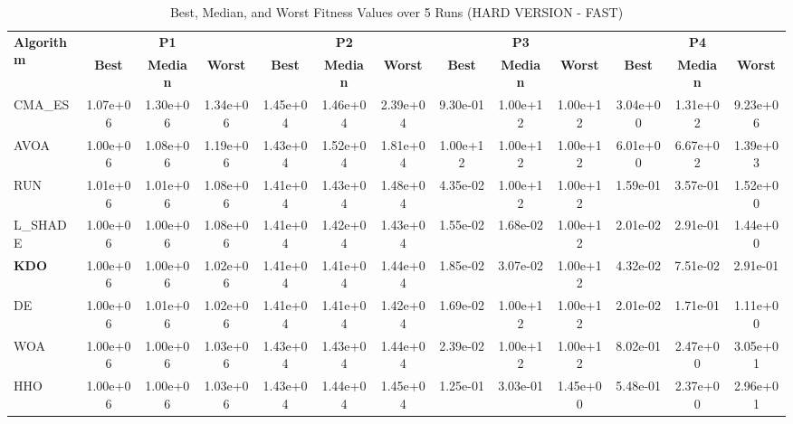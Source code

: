\begin{table}
\centering
\caption{Best, Median, and Worst Fitness Values over 5 Runs (HARD VERSION - FAST)}
\label{tab:best_median_worst}
\tiny
\setlength{\tabcolsep}{2pt}
\begin{tabular}{lcccccccccccc}
\toprule
\multirow{2}{*}{\textbf{Algorithm}} & \multicolumn{3}{c}{\textbf{P1}} & \multicolumn{3}{c}{\textbf{P2}} & \multicolumn{3}{c}{\textbf{P3}} & \multicolumn{3}{c}{\textbf{P4}} \\
\cmidrule(lr){2-4}\cmidrule(lr){5-7}\cmidrule(lr){8-10}\cmidrule(lr){11-13}
 & \textbf{Best} & \textbf{Median} & \textbf{Worst} & \textbf{Best} & \textbf{Median} & \textbf{Worst} & \textbf{Best} & \textbf{Median} & \textbf{Worst} & \textbf{Best} & \textbf{Median} & \textbf{Worst} \\
\midrule
CMA_ES & 1.07e+06 & 1.30e+06 & 1.34e+06 & 1.45e+04 & 1.46e+04 & 2.39e+04 & 9.30e-01 & 1.00e+12 & 1.00e+12 & 3.04e+00 & 1.31e+02 & 9.23e+06 \\
AVOA & 1.00e+06 & 1.08e+06 & 1.19e+06 & 1.43e+04 & 1.52e+04 & 1.81e+04 & 1.00e+12 & 1.00e+12 & 1.00e+12 & 6.01e+00 & 6.67e+02 & 1.39e+03 \\
RUN & 1.01e+06 & 1.01e+06 & 1.08e+06 & 1.41e+04 & 1.43e+04 & 1.48e+04 & 4.35e-02 & 1.00e+12 & 1.00e+12 & 1.59e-01 & 3.57e-01 & 1.52e+00 \\
L_SHADE & 1.00e+06 & 1.00e+06 & 1.08e+06 & 1.41e+04 & 1.42e+04 & 1.43e+04 & 1.55e-02 & 1.68e-02 & 1.00e+12 & 2.01e-02 & 2.91e-01 & 1.44e+00 \\
\textbf{KDO} & 1.00e+06 & 1.00e+06 & 1.02e+06 & 1.41e+04 & 1.41e+04 & 1.44e+04 & 1.85e-02 & 3.07e-02 & 1.00e+12 & 4.32e-02 & 7.51e-02 & 2.91e-01 \\
DE & 1.00e+06 & 1.01e+06 & 1.02e+06 & 1.41e+04 & 1.41e+04 & 1.42e+04 & 1.69e-02 & 1.00e+12 & 1.00e+12 & 2.01e-02 & 1.71e-01 & 1.11e+00 \\
WOA & 1.00e+06 & 1.00e+06 & 1.03e+06 & 1.43e+04 & 1.43e+04 & 1.44e+04 & 2.39e-02 & 1.00e+12 & 1.00e+12 & 8.02e-01 & 2.47e+00 & 3.05e+01 \\
HHO & 1.00e+06 & 1.00e+06 & 1.03e+06 & 1.43e+04 & 1.44e+04 & 1.45e+04 & 1.25e-01 & 3.03e-01 & 1.45e+00 & 5.48e-01 & 2.37e+00 & 2.96e+01 \\
\bottomrule
\end{tabular}
\end{table}
